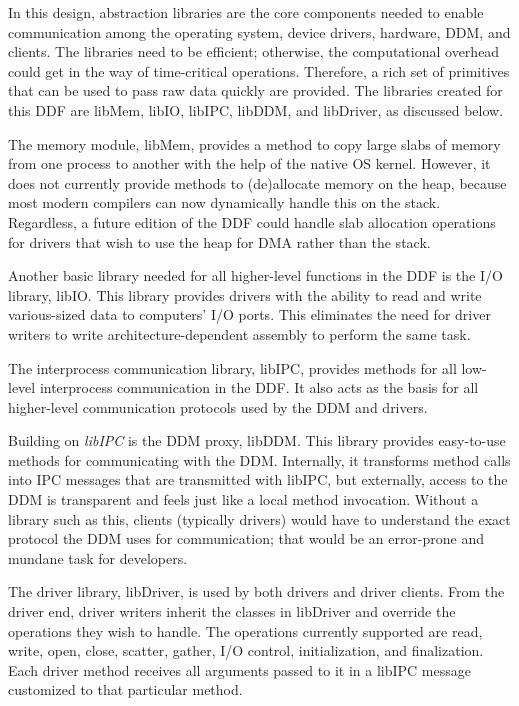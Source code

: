 
In this design, abstraction libraries are the core components needed to
enable communication among the operating system, device drivers,
hardware, DDM, and clients.  The libraries need to be
efficient; otherwise, the computational overhead could get in the
way of time-critical operations.  Therefore, a rich set of primitives that can
be used to pass raw data quickly are provided.  The libraries created for this
DDF are {\important libMem, libIO, libIPC, libDDM}, and {\important libDriver}, as discussed below.

The memory module, {\important libMem}, provides a method to copy large slabs
of memory from one process to another with the help of the native OS kernel.
However, it does not currently provide methods to (de)allocate memory on the
heap, because most modern compilers can now dynamically handle this on the
stack.  Regardless, a future edition of the DDF could handle slab
allocation operations for drivers that wish to use the heap for DMA rather
than the stack.

Another basic library needed for all higher-level functions in the DDF
is the I/O library, {\important libIO}. This library provides drivers with the
ability to read and write various-sized data to computers' I/O ports.
This eliminates the need for driver writers to write architecture-dependent
assembly to perform the same task.

The interprocess communication library, {\important libIPC}, provides
methods for all low-level interprocess communication in the DDF.
It also acts as the basis for all higher-level communication protocols used
by the DDM and drivers.

Building on {\em libIPC} is the DDM proxy, {\important libDDM}.  This library
provides easy-to-use methods for communicating with the DDM.  Internally,
it transforms method calls into IPC messages that are transmitted with
libIPC, but externally, access to the DDM is transparent and feels just like a
local method invocation.  Without a library such as this, clients
(typically drivers) would have to understand the exact protocol the DDM
uses for communication; that would be an error-prone and mundane task
for developers.

The driver library, {\important libDriver}, is used by both drivers and driver
clients.  From the driver end, driver writers inherit the classes in libDriver
and override the operations they wish to handle.  The operations currently
supported are {\important read, write, open, close, scatter, gather, I/O
control, initialization}, and {\important finalization}.  Each driver method
receives all arguments passed to it in a libIPC message customized to that
particular method.

